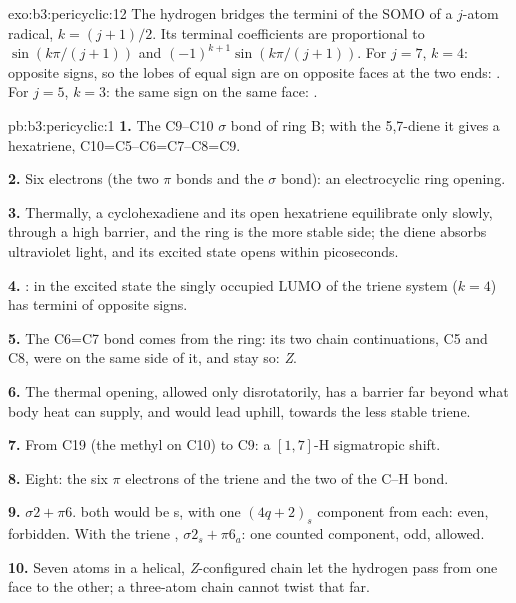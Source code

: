\begin{solution}{exo:b3:pericyclic:12}
The hydrogen bridges the termini of the SOMO of a $j$-atom radical, $k = (j + 1)/2$. Its terminal
coefficients are proportional to $\sin(k\pi/(j + 1))$ and $(-1)^{k+1}\sin(k\pi/(j + 1))$. For $j = 7$, $k = 4$: opposite signs, so
the lobes of equal sign are on opposite faces at the two ends: . For
$j = 5$, $k = 3$: the same sign on the same face: .
\end{solution}

\begin{solution}{pb:b3:pericyclic:1}
\textbf{1.} The C9--C10 $\sigma$ bond of ring B; with the 5,7-diene it gives a hexatriene,
C10=C5--C6=C7--C8=C9.

\textbf{2.} Six electrons (the two $\pi$ bonds and the $\sigma$ bond): an electrocyclic ring opening.

\textbf{3.} Thermally, a cyclohexadiene and its open hexatriene equilibrate only
slowly, through a high barrier, and the ring is the more stable side; the
diene absorbs ultraviolet light, and its excited state opens within
picoseconds.

\textbf{4.} : in the excited state the singly occupied LUMO of the triene
system ($k = 4$) has termini of opposite signs.

\textbf{5.} The C6=C7 bond comes from the ring: its two chain continuations, C5 and C8,
were on the same side of it, and stay so: \textit{Z}.

\textbf{6.} The thermal opening, allowed only disrotatorily, has a barrier far beyond what
body heat can supply, and would lead uphill, towards the less stable triene.

\textbf{7.} From C19 (the methyl on C10) to C9: a $[1,7]$-H sigmatropic shift.

\textbf{8.} Eight: the six $\pi$ electrons of the triene and the two of the C--H bond.

\textbf{9.} $\sigma2 + \pi6$.  both would be s, with one $(4q + 2)_s$ component from each:
even, forbidden. With the triene , $\sigma2_s + \pi6_a$: one counted component, odd,
allowed.

\textbf{10.} Seven atoms in a helical, \textit{Z}-configured chain let the hydrogen pass from one face to
the other; a three-atom chain cannot twist that far.


\end{solution}
